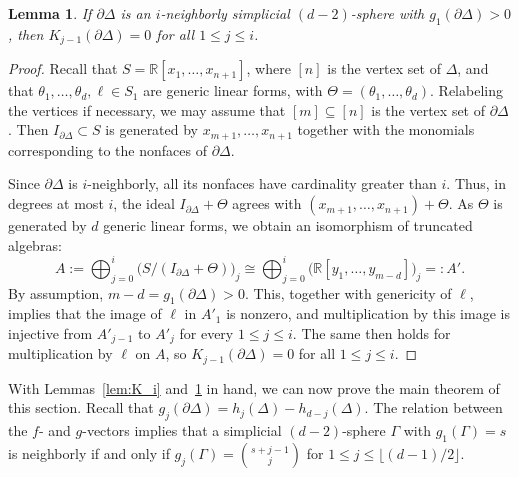 \documentclass[11pt]{article}
\newtheorem{lemma}[theorem]{Lemma}
\theoremstyle{definition}
\numberwithin{equation}{theorem}
\newcommand{\kk}{{\mathbb R}}
\begin{document}
\begin{lemma}\label{lem:K_eq_0}
If $\partial\Delta$ is an $i$-neighborly simplicial $(d-2)$-sphere with $g_1(\partial\Delta)>0$,
then $K_{j-1}(\partial\Delta)=0$ for all $1\leq j\leq i$.
\end{lemma}
\begin{proof}
   Recall that $S = \kk[x_1, \ldots, x_{n+1}]$, where $[n]$ is the vertex set of $\Delta$, and that $\theta_1, \ldots, \theta_d, \ell \in S_1$ are generic linear forms, with $\Theta = (\theta_1,\ldots, \theta_d)$. Relabeling the vertices if necessary, we may assume that $[m]\subseteq[n]$ is the vertex set of $\partial\Delta$. Then $I_{\partial\Delta}\subset S$ is generated by $x_{m+1},\ldots, x_{n+1}$ together with the monomials corresponding to the nonfaces of $\partial\Delta$.  

Since $\partial\Delta$ is $i$-neighborly, all its nonfaces have cardinality greater than $i$. Thus, in degrees at most $i$, the ideal $I_{\partial\Delta}+\Theta$ agrees with  
$(x_{m+1},\ldots,x_{n+1})+\Theta$. As $\Theta$ is generated by $d$ generic linear forms, we obtain an isomorphism of truncated algebras: 
\[
    A:=\bigoplus_{j=0}^{i}\bigl(S/(I_{\partial\Delta}+\Theta)\bigr)_j
    \cong \bigoplus_{j=0}^{i}\bigl(\kk[y_1,\ldots,y_{m-d}]\bigr)_j=:A'.
    \]
By assumption, $m-d=g_1(\partial\Delta)>0$. This, together with genericity of $\ell$, implies that the image of $\ell$ in $A'_1$ is nonzero, and multiplication by this image is injective from $A'_{j-1}$ to $A'_j$ for every $1\le j\le i$. The same then holds for multiplication by $\ell$ on $A$, so $K_{j-1}(\partial\Delta)=0$ for all $1\le j\le i$.
\end{proof}

With Lemmas~\ref{lem:K_i} and~\ref{lem:K_eq_0} in hand, we can now prove the main theorem of this section. Recall that $g_j(\partial\Delta)=h_j(\Delta)-h_{d-j}(\Delta)$. The relation between the $f$- and $g$-vectors implies that a simplicial $(d-2)$-sphere $\Gamma$ with $g_1(\Gamma)=s$ is neighborly if and only if $g_j(\Gamma)=\binom{s+j-1}{j}$ for $1\le j\le\lfloor(d-1)/2\rfloor$.
\end{document}
